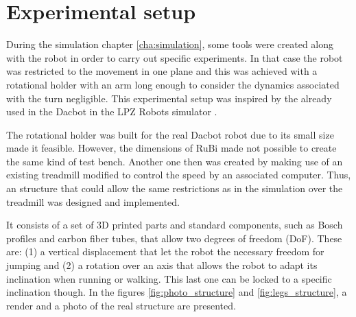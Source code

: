 \chapter{Experimental setup} %
\label{cha:experiments}
During the simulation chapter \ref{cha:simulation}, some tools were created along with the robot in order to carry out specific experiments.
In that case the robot was restricted to the movement in one plane and this was achieved with a rotational holder with an arm long enough to consider the dynamics associated with the turn negligible.
This experimental setup was inspired by the already used in the Dacbot \cite{dacbot1} in the LPZ Robots simulator \cite{lpzrobots}.

The rotational holder was built for the real Dacbot robot due to its small size made it feasible.
However, the dimensions of RuBi made not possible to create the same kind of test bench.
Another one then was created by making use of an existing treadmill modified to control the speed by an associated computer.
Thus, an structure that could allow the same restrictions as in the simulation over the treadmill was designed and implemented.

It consists of a set of 3D printed parts and standard components, such as Bosch profiles and carbon fiber tubes, that allow two degrees of freedom (DoF).
These are: (1) a vertical displacement that let the robot the necessary freedom for jumping and (2) a rotation over an axis that allows the robot to adapt its inclination when running or walking. 
This last one can be locked to a specific inclination though. In the figures \ref{fig:photo_structure} and \ref{fig:legs_structure}, a render and a photo of the real structure are presented.

